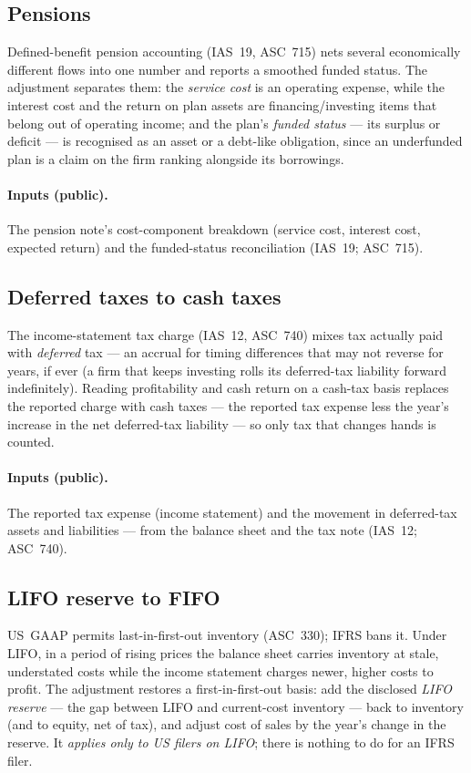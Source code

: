 \documentclass[11pt,a4paper]{report}
\begin{document}
\subsection{Pensions}
\label{sec:topics-pensions}
Defined-benefit pension accounting (IAS~19, ASC~715) nets several economically different flows into one number
and reports a smoothed funded status. The adjustment separates them: the \emph{service cost} is an operating
expense, while the interest cost and the return on plan assets are financing/investing items that belong out of
operating income; and the plan's \emph{funded status} --- its surplus or deficit --- is recognised as an asset
or a debt-like obligation, since an underfunded plan is a claim on the firm ranking alongside its borrowings.

\paragraph{Inputs (public).} The pension note's cost-component breakdown (service cost, interest cost, expected
return) and the funded-status reconciliation (IAS~19; ASC~715).

\subsection{Deferred taxes to cash taxes}
\label{sec:topics-deferredtax}
The income-statement tax charge (IAS~12, ASC~740) mixes tax actually paid with \emph{deferred} tax --- an
accrual for timing differences that may not reverse for years, if ever (a firm that keeps investing rolls its
deferred-tax liability forward indefinitely). Reading profitability and cash return on a cash-tax basis
replaces the reported charge with cash taxes --- the reported tax expense less the year's increase in the net
deferred-tax liability --- so only tax that changes hands is counted.

\paragraph{Inputs (public).} The reported tax expense (income statement) and the movement in deferred-tax
assets and liabilities --- from the balance sheet and the tax note (IAS~12; ASC~740).

\subsection{LIFO reserve to FIFO}
\label{sec:topics-lifo}
US~GAAP permits last-in-first-out inventory (ASC~330); IFRS bans it. Under LIFO, in a period of rising prices
the balance sheet carries inventory at stale, understated costs while the income statement charges newer,
higher costs to profit. The adjustment restores a first-in-first-out basis: add the disclosed \emph{LIFO
reserve} --- the gap between LIFO and current-cost inventory --- back to inventory (and to equity, net of tax),
and adjust cost of sales by the year's change in the reserve. It \emph{applies only to US filers on LIFO};
there is nothing to do for an IFRS filer.
\end{document}
